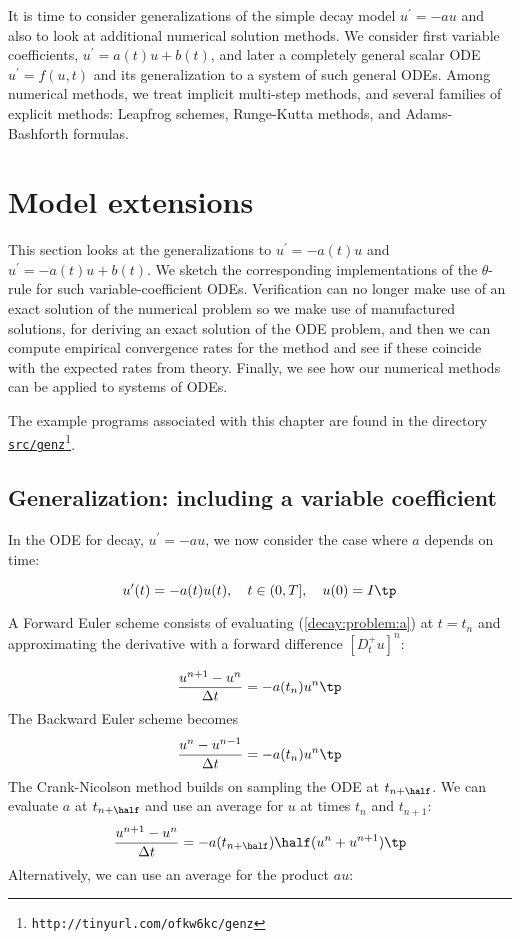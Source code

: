 \documentclass[graybox,sectrefs,envcountresetchap,open=right,final]{svmonodo}
\begin{document}
It is time to consider generalizations of the simple decay model
$u^{\prime}=-au$ and also to look at additional numerical solution
methods.  We consider first variable coefficients, $u^{\prime}=a(t)u +
b(t)$, and later a completely general scalar ODE $u^{\prime}=f(u,t)$
and its generalization to a system of such general ODEs.  Among
numerical methods, we treat implicit multi-step methods, and several
families of explicit methods: Leapfrog schemes, Runge-Kutta methods,
and Adams-Bashforth formulas.

\section{Model extensions}

This section looks at the generalizations to $u^{\prime}=-a(t)u$
and $u^{\prime}=-a(t)u + b(t)$. We sketch the corresponding
implementations of the $\theta$-rule for such variable-coefficient ODEs.
Verification can no longer make use of an exact solution of the
numerical problem so we make use of manufactured solutions,
for deriving an exact solution of the ODE problem, and then we can
compute empirical convergence rates for the method and see if these
coincide with the expected rates from theory.
Finally, we see how our numerical methods can be applied to systems
of ODEs.

The example programs associated with this chapter are found in
the directory \href{{http://tinyurl.com/ofkw6kc/genz}}{\nolinkurl{src/genz}\footnote{\texttt{http://tinyurl.com/ofkw6kc/genz}}}.

\subsection{Generalization: including a variable coefficient}

In the ODE for decay, $u^{\prime}=-au$, we now consider the case where $a$
depends on time:

\begin{equation}
u^{\prime}(t) = -a(t)u(t),\quad t\in (0,T],\quad u(0)=I \tp
\label{decay:problem:a}
\end{equation}

A Forward Euler scheme consists of evaluating (\ref{decay:problem:a})
at $t=t_n$ and approximating the derivative with a forward
difference $[D^+_t u]^n$:

\begin{equation}
\frac{u^{n+1} - u^n}{\Delta t} = -a(t_n)u^n
\tp
\end{equation}
The Backward Euler scheme becomes
\begin{equation}
\frac{u^{n} - u^{n-1}}{\Delta t} = -a(t_n)u^n
\tp
\end{equation}
The Crank-Nicolson method builds on sampling the ODE at
$t_{n+\half}$. We can evaluate $a$ at $t_{n+\half}$
and use an average for $u$ at
times $t_n$ and $t_{n+1}$:
\begin{equation}
\frac{u^{n+1} - u^{n}}{\Delta t} = -a(t_{n+\half})\half(u^n + u^{n+1})
\tp
\end{equation}
Alternatively, we can use an average for the product $au$:
\end{document}
